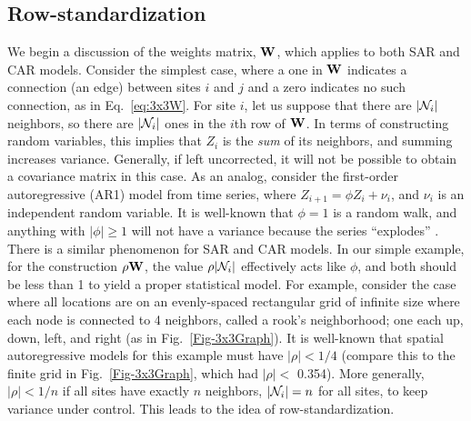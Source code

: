 \documentclass[11pt, titlepage]{article}\usepackage[]{graphicx}\usepackage[]{color}
\begin{document}
\begin{spacing}{1.9}
\begin{flushleft}

\subsection*{Row-standardization}

We begin a discussion of the weights matrix, $\mathbf{W}$, which applies to both SAR and CAR models.  Consider the simplest case, where a one in $\mathbf{W}$ indicates a connection (an edge) between sites $i$ and $j$ and a zero indicates no such connection, as in Eq.~\ref{eq:3x3W}.  For site $i$, let us suppose that there are $|\mathcal{N}_i|$ neighbors, so there are $|\mathcal{N}_i|$ ones in the $i$th row of $\mathbf{W}$.  In terms of constructing random variables, this implies that $Z_i$ is the \textit{sum} of its neighbors, and summing increases variance.  Generally, if left uncorrected, it will not be possible to obtain a covariance matrix in this case. As an analog, consider the first-order autoregressive (AR1) model from time series, where $Z_{i+1} = \phi Z_i + \nu_i$, and $\nu_i$ is an independent random variable.  It is well-known that $\phi = 1$ is a random walk, and anything with $|\phi| \geq 1$ will not have a variance because the series ``explodes'' \citep[e.g.,][pg. 53]{Hami:time:1994}.  There is a similar phenomenon for SAR and CAR models. In our simple example, for the construction $\rho\mathbf{W}$, the value  $\rho |\mathcal{N}_i|$ effectively acts like $\phi$, and both should be less than 1 to yield a proper statistical model. For example, consider the case where all locations are on an evenly-spaced rectangular grid of infinite size where each node is connected to 4 neighbors, called a rook's neighborhood; one each up, down, left, and right (as in Fig.~\ref{Fig-3x3Graph}). It is well-known that spatial autoregressive models for this example must have $|\rho| < 1/4$ \citep[pg. 82]{Hain:spat:1990} (compare this to the finite grid in Fig.~\ref{Fig-3x3Graph}, which had $|\rho| <$ 0.354). More generally, $|\rho| < 1/n$ if all sites have exactly $n$ neighbors, $|\mathcal{N}_i| = n$ for all sites, to keep variance under control. This leads to the idea of row-standardization.  


\end{flushleft}
\end{spacing}
\end{document}
